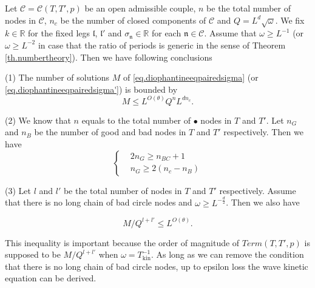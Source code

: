 \begin{prop}\label{prop.counting}
Let $\mathcal{C}=\mathcal{C}(T,T',p)$ be an open admissible couple, $n$ be the total number of nodes in $\mathcal{C}$, $n_c$ be the number of closed components of $\mathcal{C}$ and $Q=L^{d}\sqrt{\omega}$. We fix $k\in \mathbb{R}$ for the fixed legs $\mathfrak{l}$, $\mathfrak{l}'$ and $\sigma_{\mathfrak{n}}\in\mathbb{R}$ for each $\mathfrak{n}\in \mathcal{C}$. Assume that $\omega\ge L^{-1}$ (or $\omega\ge L^{-2}$ in case that the ratio of periods is generic in the sense of Theorem \ref{th.numbertheory}). Then we have following conclusions

(1) The number of solutions $M$ of \eqref{eq.diophantineeqpairedsigma} (or \eqref{eq.diophantineeqpairedsigma'}) is bounded by 
\begin{equation}\label{eq.countingbd0}
    M\leq L^{O(\theta)} Q^{n} L^{dn_c}.
\end{equation}

(2) We know that $n$ equals to the total number of $\bullet$ nodes in $T$ and $T'$. Let $n_G$ and $n_B$ be the number of good and bad nodes in $T$ and $T'$ respectively. Then we have 
\begin{equation}\label{eq.ineqn_Gn_B}
    \left\{\begin{aligned}
        & 2n_G \ge n_{BC}+1
        \\
        & n_G \ge 2(n_c - n_B)
    \end{aligned}\right.
\end{equation}




(3) Let $l$ and $l'$ be the total number of nodes in $T$ and $T'$ respectively. Assume that there is no long chain of bad circle nodes and $\omega \ge L^{-\frac{d}{2}}$. Then we also have 

\begin{equation}\label{eq.countingbd1}
    M/Q^{l+l'}\leq L^{O(\theta)}. 
\end{equation}

This inequality is important because the order of magnitude of $Term(T,T',p)$ is supposed to be  $M/Q^{l+l'}$ when $\omega=T_{\text{kin}}^{-1}$. As long as we can remove the condition that there is no long chain of bad circle nodes, up to epsilon loss the wave kinetic equation can be derived.

\end{prop}
